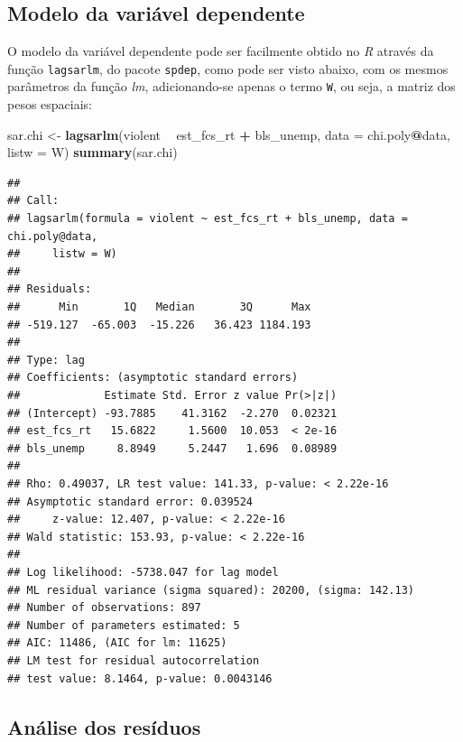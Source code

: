 \documentclass[12pt,]{article}
\newenvironment{Shaded}{\begin{snugshade}}{\end{snugshade}}
\newcommand{\KeywordTok}[1]{\textcolor[rgb]{0.13,0.29,0.53}{\textbf{#1}}}
\newcommand{\DataTypeTok}[1]{\textcolor[rgb]{0.13,0.29,0.53}{#1}}
\newcommand{\StringTok}[1]{\textcolor[rgb]{0.31,0.60,0.02}{#1}}
\newcommand{\OperatorTok}[1]{\textcolor[rgb]{0.81,0.36,0.00}{\textbf{#1}}}
\newcommand{\NormalTok}[1]{#1}
\begin{document}
\subsection{Modelo da variável
dependente}\label{modelo-da-variavel-dependente}

O modelo da variável dependente pode ser facilmente obtido no \emph{R}
através da função \texttt{lagsarlm}, do pacote \texttt{spdep}, como pode
ser visto abaixo, com os mesmos parâmetros da função \emph{lm},
adicionando-se apenas o termo \texttt{W}, ou seja, a matriz dos pesos
espaciais:

\begin{Shaded}
\begin{Highlighting}[]
\NormalTok{sar.chi <-}
\StringTok{  }\KeywordTok{lagsarlm}\NormalTok{(violent }\OperatorTok{~}\StringTok{ }\NormalTok{est_fcs_rt }\OperatorTok{+}\StringTok{ }\NormalTok{bls_unemp, }
           \DataTypeTok{data =}\NormalTok{ chi.poly}\OperatorTok{@}\NormalTok{data, }\DataTypeTok{listw =}\NormalTok{ W)}
  \KeywordTok{summary}\NormalTok{(sar.chi)}
\end{Highlighting}
\end{Shaded}

\begin{verbatim}
## 
## Call:
## lagsarlm(formula = violent ~ est_fcs_rt + bls_unemp, data = chi.poly@data, 
##     listw = W)
## 
## Residuals:
##      Min       1Q   Median       3Q      Max 
## -519.127  -65.003  -15.226   36.423 1184.193 
## 
## Type: lag 
## Coefficients: (asymptotic standard errors) 
##             Estimate Std. Error z value Pr(>|z|)
## (Intercept) -93.7885    41.3162  -2.270  0.02321
## est_fcs_rt   15.6822     1.5600  10.053  < 2e-16
## bls_unemp     8.8949     5.2447   1.696  0.08989
## 
## Rho: 0.49037, LR test value: 141.33, p-value: < 2.22e-16
## Asymptotic standard error: 0.039524
##     z-value: 12.407, p-value: < 2.22e-16
## Wald statistic: 153.93, p-value: < 2.22e-16
## 
## Log likelihood: -5738.047 for lag model
## ML residual variance (sigma squared): 20200, (sigma: 142.13)
## Number of observations: 897 
## Number of parameters estimated: 5 
## AIC: 11486, (AIC for lm: 11625)
## LM test for residual autocorrelation
## test value: 8.1464, p-value: 0.0043146
\end{verbatim}

\subsection{Análise dos resíduos}\label{analise-dos-residuos}
\end{document}
